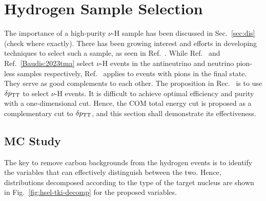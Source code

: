 \section{Hydrogen Sample Selection}
\label{sec:mc-hydrogen}
The importance of a high-purity $\nu$-H sample has been discussed in Sec.~\ref{sec:dis} (check where exactly).
There has been growing interest and efforts in developing techniques to select such a sample, as seen in Ref.~\cite{Lu:2015hea,MINERvA:2023avz,Baudis:2023tma}.
While Ref.~\cite{MINERvA:2023avz} and Ref.~\ref{Baudis:2023tma} select $\nu$-H events in the antineutrino and neutrino pion-less samples respectively, Ref.~\cite{Lu:2015hea} applies to events with pions in the final state. 
They serve as good complements to each other.
The proposition in Rec.~\cite{Lu:2015} is to use $\delta p_\textrm{TT}$ to select $\nu$-H events.
It is difficult to achieve optimal efficiency and purity with a one-dimensional cut. 
Hence, the COM total energy cut is proposed as a complementary cut to $\delta p_\textrm{TT}$, and this section shall demonstrate its effectiveness.

\subsection{MC Study}
\label{sec:mc-hydrogen-ana}
     The key to remove carbon backgrounds from the hydrogen events is to identify the variables that can effectively distinguish between the two.
     Hence, distributions decomposed according to the type of the target nucleus are shown in Fig.~\ref{fig:hsel-tki-decomp} for the proposed variables.

